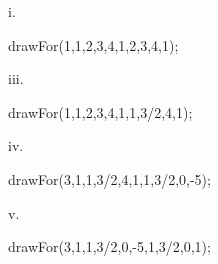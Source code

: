 \documentclass[../textbook.tex]{subfiles}
\begin{document}
\begin{figure}[h]
	\begin{center}
		\begin{minipage}[c]{0.45\textwidth}
			\begin{center}
				\begin{minipage}[b]{0.45\textwidth}
					i.
					\centering
					\begin{asy}[width=0.7\textwidth]
						drawFor(1,1,2,3,4,1,2,3,4,1);
					\end{asy}
				\end{minipage}
				\hfill
				\begin{minipage}[b]{0.45\textwidth}
					iii.
					\centering
					\begin{asy}[width=0.7\textwidth]
						drawFor(1,1,2,3,4,1,1,3/2,4,1);
					\end{asy}
				\end{minipage}
			\end{center}

			\begin{center}
				\begin{minipage}[b]{0.45\textwidth}
					iv.
					\centering
					\begin{asy}[width=0.7\textwidth]
						drawFor(3,1,1,3/2,4,1,1,3/2,0,-5);
					\end{asy}
				\end{minipage}
				\hfill
				\begin{minipage}[b]{0.45\textwidth}
					v.
					\centering
					\begin{asy}[width=0.7\textwidth]
						drawFor(3,1,1,3/2,0,-5,1,3/2,0,1);
					\end{asy}
				\end{minipage}
			\end{center}


\end{minipage}
\end{center}
\end{figure}
\end{document}
